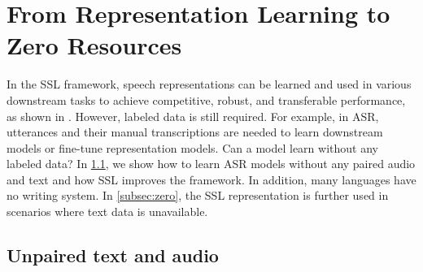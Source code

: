 
\section{From Representation Learning to Zero Resources}
\label{sec:zero}



In the SSL framework, speech representations can be
learned and used in various downstream tasks to achieve competitive, robust,
and transferable performance, as shown in
. 
However, labeled data is still required. 
For example, in ASR, utterances and their manual transcriptions are needed to learn downstream models or fine-tune representation models. 
Can a model learn without any labeled data? 
In \cref{secsec:unpaired}, we show how to learn ASR models without any paired audio and text and how SSL improves the framework.
In addition, many languages have no writing system. 
In \cref{subsec:zero}, the SSL representation is further used in scenarios where text data is unavailable.

\subsection{Unpaired text and audio} \label{secsec:unpaired}

